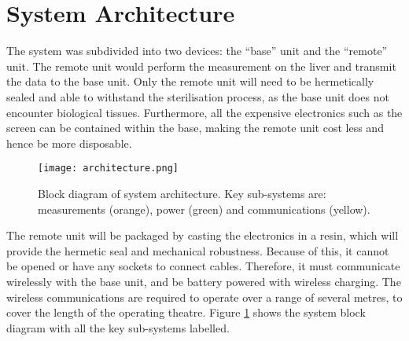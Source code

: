 \section{System Architecture}

The system was subdivided into two devices: the ``base'' unit and the ``remote'' unit. The remote unit would perform the measurement on the liver and transmit the data to the base unit. Only the remote unit will need to be hermetically sealed and able to withstand the sterilisation process, as the base unit does not encounter biological tissues. Furthermore, all the expensive electronics such as the screen can be contained within the base, making the remote unit cost less and hence be more disposable.\\

\begin{figure}[htb]
	\centering
	\texttt{[image: architecture.png]}
	\caption{Block diagram of system architecture. Key sub-systems are: measurements (orange), power (green) and communications (yellow).}
	\label{fig: architecture}
\end{figure}

The remote unit will be packaged by casting the electronics in a resin, which will provide the hermetic seal and mechanical robustness. Because of this, it cannot be opened or have any sockets to connect cables. Therefore, it must communicate wirelessly with the base unit, and be battery powered with wireless charging. The wireless communications are required to operate over a range of several metres, to cover the length of the operating theatre. Figure \ref{fig: architecture} shows the system block diagram with all the key sub-systems labelled.